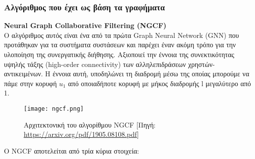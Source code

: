 \subsubsection{Αλγόριθμος που έχει ως βάση τα γραφήματα}
\noindent\textbf{Neural Graph Collaborative Filtering (NGCF)}\\
Ο αλγόριθμος αυτός \cite{wangNeuralGraphCollaborative2019} είναι ένα από τα πρώτα Graph Neural Network (GNN) που προτάθηκαν για τα συστήματα συστάσεων και παρέχει έναν ακόμη τρόπο για την υλοποίηση της συνεργατικής διήθησης. Αξιοποιεί την έννοια της συνεκτικότητας υψηλής τάξης (high-order connectivity) των αλληλεπιδράσεων χρηστών-αντικειμένων. Η έννοια αυτή, υποδηλώνει τη διαδρομή μέσω της οποίας μπορούμε να πάμε στην κορυφή $ u_1  $ από οποιαδήποτε κορυφή με μήκος διαδρομής l μεγαλύτερο από 1.\\ 
\begin{figure}[!htb]
	\centering
	\texttt{[image: ngcf.png]}
	\caption[Αρχιτεκτονική του αλγορίθμου NGCF]{Αρχιτεκτονική του αλγορίθμου NGCF [Πηγή: \url{https://arxiv.org/pdf/1905.08108.pdf}]}
	\label{fig:ngcf}
\end{figure}
Ο NGCF αποτελείται από τρία κύρια στοιχεία:
